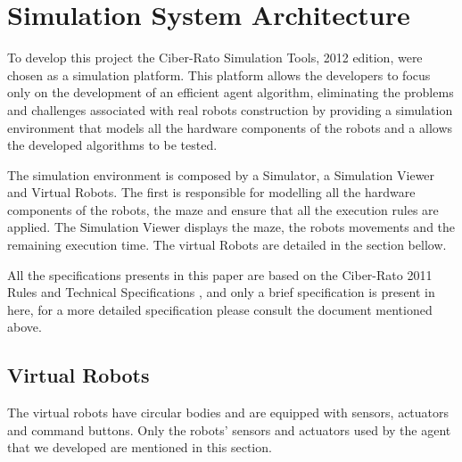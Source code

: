\documentclass[oribibl]{llncs}
\begin{document}
\section{Simulation System Architecture}
To develop this project the Ciber-Rato Simulation Tools, 2012 edition, were chosen as a simulation platform. This platform allows the developers to focus only on the development of an efficient agent algorithm, eliminating the problems and challenges associated with real robots construction by providing a simulation environment that models all the hardware components of the robots and a allows the developed algorithms to be tested\cite{Lau2002}. 

The simulation environment is composed by a Simulator, a Simulation Viewer and Virtual Robots. The first is responsible for modelling all the hardware components of the robots, the maze and ensure that all the execution rules are applied. The Simulation Viewer displays the maze, the robots movements and the remaining execution time. The virtual Robots are detailed in the section bellow.

All the specifications presents in this paper are based on the Ciber-Rato 2011 Rules and Technical Specifications \cite{DepartamentodeElectronica2011}, and only a brief specification is present in here, for a more detailed specification please consult the document mentioned above.

\subsection{Virtual Robots}
The virtual robots have circular bodies and are equipped with sensors, actuators and command buttons. Only the robots' sensors and actuators used by the agent that we developed are mentioned in this section.
\end{document}
